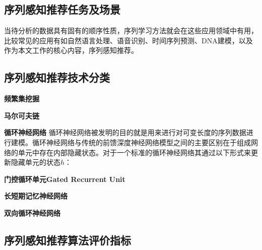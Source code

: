 \subsection{序列感知推荐任务及场景}

当待分析的数据具有固有的顺序性质，序列学习方法就会在这些应用领域中有用，比较常见的应用有如自然语言处理、语音识别、时间序列预测、DNA建模，以及作为本文工作的核心内容，序列感知推荐。


\subsection{序列感知推荐技术分类}

\textbf{频繁集挖掘}

\textbf{马尔可夫链}

\textbf{循环神经网络}
循环神经网络被发明的目的就是用来进行对可变长度的序列数据进行建模。循环神经网络与传统的前馈深度神经网络模型之间的主要区别在于组成网络的单元中存在内部隐藏状态。对于一个标准的循环神经网络其通过以下形式来更新隐藏单元的状态$h$：




\textbf{门控循环单元Gated Recurrent Unit}

\textbf{长短期记忆神经网络}

\textbf{双向循环神经网络}






\subsection{序列感知推荐算法评价指标}



